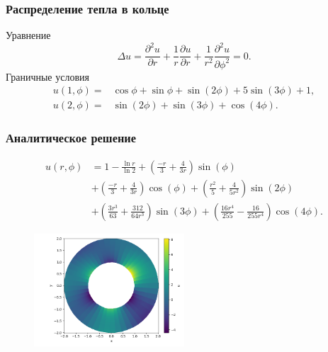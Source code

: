 \documentclass[t]{beamer}
\newcommand{\brr}[1]{{\left( #1 \right)}}
\begin{document}
    \begin{frame}
        \frametitle{Распределение тепла в кольце}
        Уравнение
        \begin{equation*}
            \Delta u = \frac{\partial^2 u}{\partial r} + \frac{1}{r} \frac{\partial u}{\partial r} + \frac{1}{r^2}\frac{\partial^2 u}{\partial \phi^2} = 0.
        \end{equation*}
        Граничные условия
        \begin{equation*}
            \begin{aligned}
                u(1,\phi)= & \cos\phi+\sin\phi+\sin(2\phi)+5\sin(3\phi)+1, \\
                u(2,\phi)= & \sin(2\phi)+\sin(3\phi)+\cos(4\phi).
            \end{aligned}
        \end{equation*}
        
    \end{frame}
    \begin{frame}
        \frametitle{Аналитическое решение}
        \begin{equation*}\label{eq:termal}
            \begin{split}
                u(r,\phi) & = 1-\frac{\ln r}{\ln 2}+\brr{\frac{-r}{3}+\frac{4}{3r}}\sin(\phi)\\
                &+\brr{\frac{-r}{3}+\frac{4}{3r}}\cos(\phi)+\brr{\frac{r^2}{5}+\frac{4}{5r^2}}\sin(2\phi)\\
                &+\brr{\frac{3r^3}{63}+\frac{312}{64r^3}}\sin(3\phi)+\brr{\frac{16r^4}{255}-\frac{16}{255r^4}}\cos(4\phi).
            \end{split}
        \end{equation*}
        \begin{figure}[ht]
            \center
            \includegraphics[width=0.5\textwidth]{../plots/termal/solut analit.png}
        \end{figure}
    \end{frame}
\end{document}
